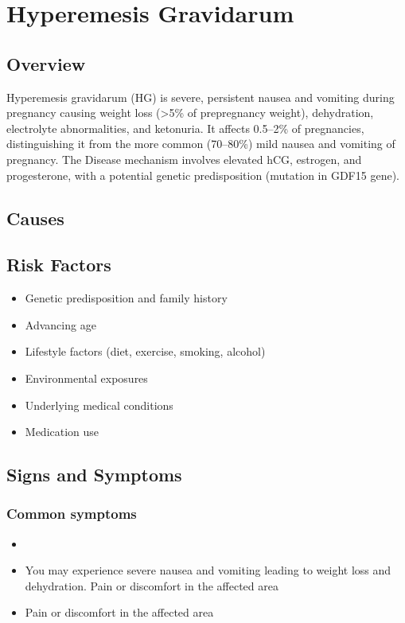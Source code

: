\chapter{Hyperemesis Gravidarum}
\label{sec:Hyperemesis Gravidarum}

\section{Overview}
Hyperemesis gravidarum (HG) is severe, persistent nausea and vomiting during pregnancy causing weight loss (>5\% of prepregnancy weight), dehydration, electrolyte abnormalities, and ketonuria. It affects 0.5--2\% of pregnancies, distinguishing it from the more common (70--80\%) mild nausea and vomiting of pregnancy. The Disease mechanism involves elevated hCG, estrogen, and progesterone, with a potential genetic predisposition (mutation in GDF15 gene).
\section{Causes}
\section{Risk Factors}

\begin{itemize}[noitemsep]
  \item Genetic predisposition and family history
  \item Advancing age
  \item Lifestyle factors (diet, exercise, smoking, alcohol)
  \item Environmental exposures
  \item Underlying medical conditions
  \item Medication use
\end{itemize}
\section{Signs and Symptoms}

\subsection{Common symptoms}
\begin{itemize}[noitemsep]
  \item \item You may experience severe nausea and vomiting leading to weight loss and dehydration. Pain or discomfort in the affected area    \item Pain or discomfort in the affected area
  \end{itemize}

